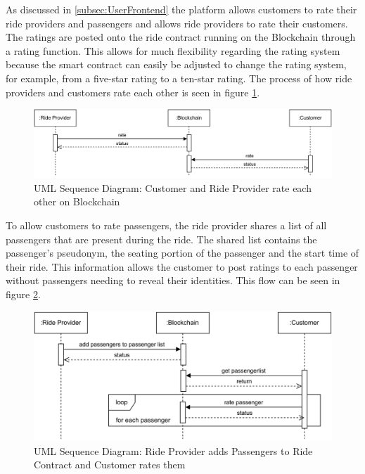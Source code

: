 As discussed in \ref{subsec:UserFrontend} the platform allows customers to rate their ride providers and passengers and allows ride providers to rate their customers. The ratings are posted onto the ride contract running on the Blockchain through a rating function. This allows for much flexibility regarding the rating system because the smart contract can easily be adjusted to change the rating system, for example, from a five-star rating to a ten-star rating. The process of how ride providers and customers rate each other is seen in figure \ref{fig:ratingFlow}.
\begin{figure}[h]
    \centering
    \includegraphics[width=\linewidth]{data/6.svg}
    \caption{UML Sequence Diagram: Customer and Ride Provider rate each other on Blockchain}
    \label{fig:ratingFlow}
\end{figure}

To allow customers to rate passengers, the ride provider shares a list of all passengers that are present during the ride. The shared list contains the passenger's pseudonym, the seating portion of the passenger and the start time of their ride. This information allows the customer to post ratings to each passenger without passengers needing to reveal their identities. This flow can be seen in figure \ref{fig:addPassenger}.

\begin{figure}[h]
    \centering
    \includegraphics[width=\linewidth]{data/8.svg}
    \caption{UML Sequence Diagram: Ride Provider adds Passengers to Ride Contract and Customer rates them}
    \label{fig:addPassenger}
\end{figure}


